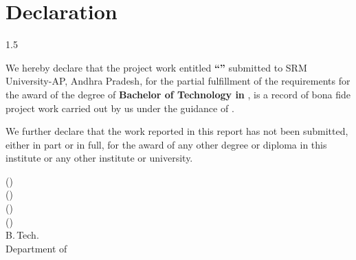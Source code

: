 \newpage
\thispagestyle{empty}
\chapter*{Declaration}
\begin{spacing}{1.5}

We hereby declare that the project work entitled \textbf{``\vtitle''} submitted to SRM University-AP, Andhra Pradesh, for the partial fulfillment of the requirements for the award of the degree of \textbf{Bachelor of Technology in \vdept}, is a record of bona fide project work carried out by us under the guidance of \vguide.

We further declare that the work reported in this report has not been submitted, either in part or in full, for the award of any other degree or diploma in this institute or any other institute or university.

\vspace{1.5cm}

\begin{flushright}
\vnameone\quad(\vregisternumberone)\\
\vnametwo\quad(\vregisternumbertwo)\\
\vnamethree\quad(\vregisternumberthree)\\
\vnamefour\quad(\vregisternumberfour)\\[0.5cm]
B.\,Tech.\\
Department of \vdept\\
\vcollege
\end{flushright}

\end{spacing}
\newpage
